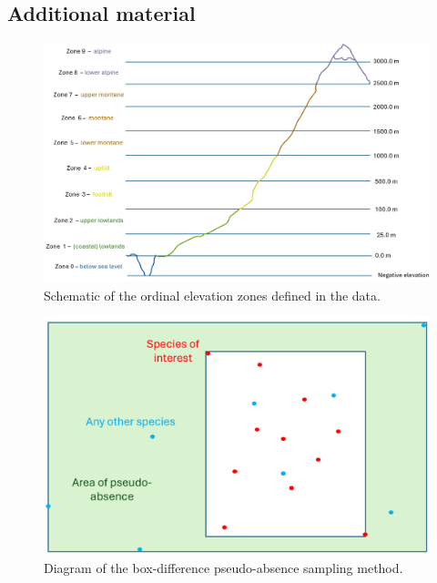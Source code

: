 \documentclass{article}
\begin{document}
\subsection*{Additional material}
\begin{figure}[H]
    \centering
    \begin{minipage}{0.90\textwidth}
        \centering
        \includegraphics[width=\textwidth]{figures/elevationzonation.png}
        \caption{Schematic of the ordinal elevation zones defined in the data.}
        \label{fig:elevations}
    \end{minipage}\hfill
\end{figure}

\begin{figure}[H]
\begin{minipage}{0.90\textwidth}
        \centering
        \includegraphics[width=\textwidth]{figures/boxdifference.png}
        \caption{Diagram of the box-difference pseudo-absence sampling method.}
        \label{fig:absences}
    \end{minipage}
\end{figure}
\end{document}
